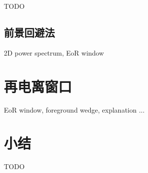 TODO

\subsection{前景回避法}

2D power spectrum, EoR window


\section{再电离窗口}

EoR window, foreground wedge, explanation ...


\section{小结}

TODO


